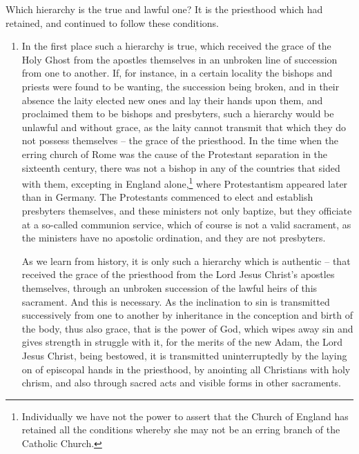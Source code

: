 Which hierarchy is the true and lawful one? 
It is the priesthood which had retained, and 
continued to follow these conditions. 

\begin{enumerate}
    \item In the first place such a hierarchy is true, 
    which received the grace of the Holy Ghost 
    from the apostles themselves in an unbroken 
    line of succession from one to another. If, for 
    instance, in a certain locality the bishops and 
    priests were found to be wanting, the succession
    being broken, and in their absence the 
    laity elected new ones and lay their hands upon 
    them, and proclaimed them to be bishops and 
    presbyters, such a hierarchy would be unlawful
    and without grace, as the laity cannot 
    transmit that which they do not possess themselves 
    -- the grace of the priesthood. In the 
    time when the erring church of Rome was the 
    cause of the Protestant separation in the sixteenth
    century, there was not a bishop in any of 
    the countries that sided with them, excepting in 
    England alone,\footnote{Individually we have not the power to assert that 
    the Church of England has retained all the conditions 
    whereby she may not be an erring branch of the Catholic 
    Church.} where Protestantism appeared 
    later than in Germany. The Protestants commenced
    to elect and establish presbyters themselves,
    and these ministers not only baptize, 
    but they officiate at a so-called communion 
    service, which of course is not a valid sacrament,
    as the ministers have no apostolic ordination,
    and they are not presbyters. 

    As we learn from history, it is only such a 
    hierarchy which is authentic -- that received 
    the grace of the priesthood from the Lord 
    Jesus Christ's apostles themselves, through an 
    unbroken succession of the lawful heirs of this 
    sacrament. And this is necessary. As the 
    inclination to sin is transmitted successively 
    from one to another by inheritance in the conception
    and birth of the body, thus also grace, 
    that is the power of God, which wipes away sin 
    and gives strength in struggle with it, for the 
    merits of the new Adam, the Lord Jesus Christ, 
    being bestowed, it is transmitted uninterruptedly
    by the laying on of episcopal hands in 
    the priesthood, by anointing all Christians with 
    holy chrism, and also through sacred acts and 
    visible forms in other sacraments. 


\end{enumerate}
